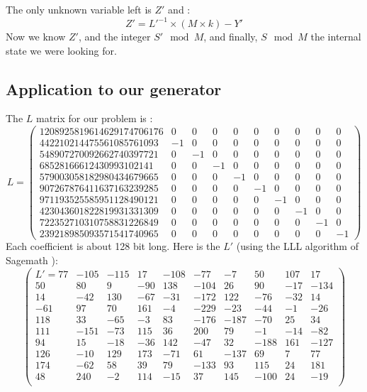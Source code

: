 \documentclass[preprint]{iacrtrans}
\begin{document}
The only unknown variable left is $Z'$ and :
\begin{equation}
    Z' = L'^{-1} \times (M \times k) - Y' 
\end{equation}
Now we know $Z'$, and the integer $S' \mod{M}$, and finally, $S \mod{M}$ the internal state we were looking for.\\

\subsection{Application to our generator}
The $L$ matrix for our problem is :
\begin{equation}
    L=
\begin{pmatrix}
1208925819614629174706176 & 0 &  0 &  0 &  0 &  0 &  0 &  0 &  0 & 0\\
442210214475561085761093 & -1 &  0 &  0 &  0 & 0 &  0 &  0 &  0 &  0\\
548907270092662740397721 & 0 & -1 &  0 &  0 & 0 &  0 &  0 &  0 &  0\\
68528166612430993102141 & 0 &  0 & -1 &  0 & 0 &  0 &  0 &  0 &  0\\
579003058182980434679665 & 0 &  0 &  0 & -1 & 0 &  0 &  0 &  0 &  0\\
907267876411637163239285 & 0 &  0 &  0 &  0 & -1 &  0 &  0 &  0 &  0\\
971193525585951128490121 & 0 &  0 &  0 &  0 & 0 & -1 &  0 &  0 &  0\\
423043601822819931331309 & 0 &  0 &  0 &  0 & 0 &  0 & -1 &  0 &  0\\
722352710310758831226849 & 0 &  0 &  0 &  0 & 0 &  0 &  0 & -1 &  0\\
239218985093571541740965 & 0 &  0 &  0 &  0 & 0 &  0 &  0 &  0 & -1
\end{pmatrix}
\end{equation}
Each coefficient is about 128 bit long. Here is the $L'$ (using the LLL algorithm of Sagemath \cite{sagemath}):
\begin{equation}
\begin{pmatrix}
    L' =
    77 & -105 & -115 &  17 & -108 & -77  & -7 &  50 & 107 &  17\\
     50  & 80 & 9 & -90 &  138 & -104  & 26  & 90 & -17 & -134\\
    14 & -42 & 130 & -67 & -31 & -172 & 122 & -76 & -32 &  14\\
    -61 &  97 &  70 & 161  & -4 & -229 & -23 & -44  & -1 & -26\\
    118  & 33 & -65 &  -3 &  83 & -176 & -187 & -70 &  25 &  34\\
    111 & -151 & -73 & 115 &  36 & 200 &  79  & -1 & -14 & -82\\
    94  & 15 & -18 & -36 & 142 & -47 &  32 & -188 & 161 & -127\\
    126 & -10 & 129 & 173 & -71  & 61 & -137 &  69 & 7 &  77\\
    174 & -62 &  58  & 39 &  79 & -133 &  93 & 115 &  24 & 181\\
    48 & 240 &  -2 & 114 & -15 &  37 & 145 & -100 &  24 & -19\\
\end{pmatrix}
\end{equation}
\end{document}
